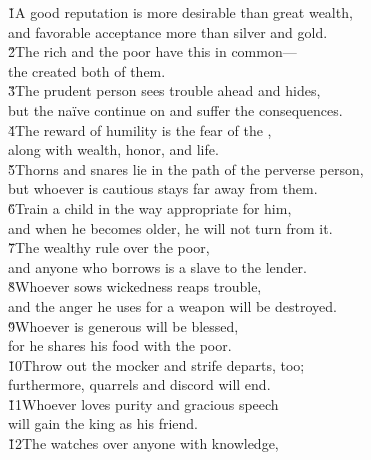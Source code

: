 \begin{poetry}
\poeml {}
\v{1}A good reputation is more desirable than great wealth, \\
\poeml and favorable acceptance more than silver and gold. \\
\poeml \v{2}The rich and the poor have this in common--- \\
\poemll    the  created both of them. \\
\poeml \v{3}The prudent person sees trouble ahead and hides, \\
\poemll    but the na\"{i}ve continue on and suffer the consequences. \\
\poeml \v{4}The reward of humility is the fear of the , \\
\poemll    along with wealth, honor, and life. \\
\poeml \v{5}Thorns and snares lie in the path of the perverse person, \\
\poemll    but whoever is cautious stays far away from them. \\
\poeml \v{6}Train a child in the way appropriate for him, \\
\poemll    and when he becomes older, he will not turn from it. \\
\poeml \v{7}The wealthy rule over the poor, \\
\poemll    and anyone who borrows is a slave to the lender. \\
\poeml \v{8}Whoever sows wickedness reaps trouble, \\
\poemll    and the anger he uses for a weapon will be destroyed. \\
\poeml \v{9}Whoever is generous will be blessed, \\
\poemll    for he shares his food with the poor. \\
\poeml \v{10}Throw out the mocker and strife departs, too; \\
\poemll    furthermore, quarrels and discord will end. \\
\poeml \v{11}Whoever loves purity and gracious speech \\
\poemll    will gain the king as his friend. \\
\poeml \v{12}The  watches over anyone with knowledge, \\

\end{poetry}
